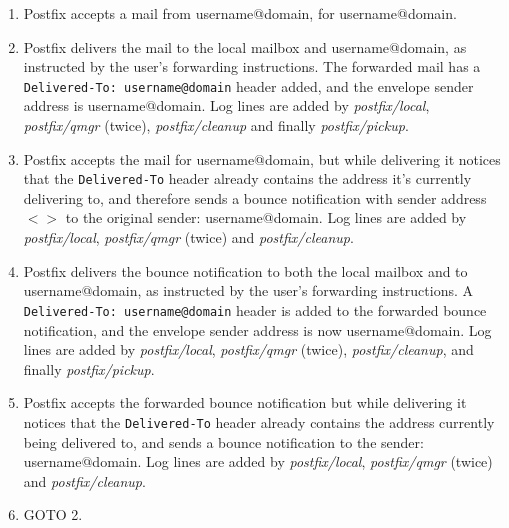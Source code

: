 \documentclass[a4paper,12pt,draft]{article}
\begin{document}
\begin{enumerate}

    \item Postfix accepts a mail from username@domain, for
        username@domain.

    \item Postfix delivers the mail to the local mailbox and
        username@domain, as instructed by the user's forwarding
        instructions. The forwarded mail has a
        \texttt{Delivered-To:~username@domain} header added, and the
        envelope sender address is username@domain.  Log lines are added by
        \textit{postfix/local}, \textit{postfix/qmgr\/} (twice),
        \textit{postfix/cleanup\/} and finally \textit{postfix/pickup}.

    \item Postfix accepts the mail for username@domain, but while
        delivering it notices that the \texttt{Delivered-To} header already
        contains the address it's currently delivering to, and therefore
        sends a bounce notification with sender address \textit{$<>$\/} to
        the original sender: username@domain.  Log lines are added by
        \textit{postfix/local}, \textit{postfix/qmgr\/} (twice) and
        \textit{postfix/cleanup}.

    \item Postfix delivers the bounce notification to both the local
        mailbox and to username@domain, as instructed by the user's
        forwarding instructions.  A \texttt{Delivered-To:~username@domain}
        header is added to the forwarded bounce notification, and the
        envelope sender address is now username@domain.  Log lines are
        added by \textit{postfix/local},
        \textit{postfix/qmgr\/} (twice), \textit{postfix/cleanup}, and finally
        \textit{postfix/pickup}.

    \item Postfix accepts the forwarded bounce notification but while
        delivering it notices that the \texttt{Delivered-To} header already
        contains the address currently being delivered to, and sends a
        bounce notification to the sender: username@domain.  Log lines are
        added by \textit{postfix/local}, \textit{postfix/qmgr\/} (twice)
        and \textit{postfix/cleanup}.

    \item GOTO 2.

\end{enumerate}
\end{document}
